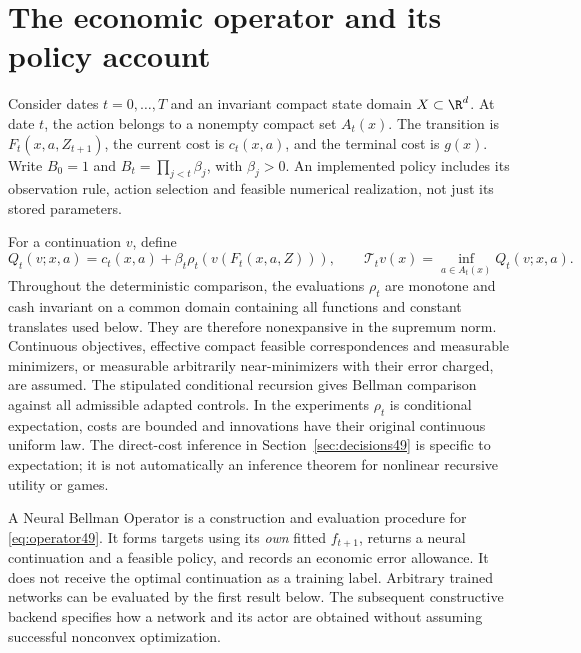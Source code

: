 \section{The economic operator and its policy account}\label{sec:core49}
Consider dates $t=0,\ldots,T$ and an invariant compact state domain $X\subset\R^d$. At date $t$, the action belongs to a nonempty compact set $A_t(x)$. The transition is $F_t(x,a,Z_{t+1})$, the current cost is $c_t(x,a)$, and the terminal cost is $g(x)$. Write $B_0=1$ and $B_t=\prod_{j<t}\beta_j$, with $\beta_j>0$. An implemented policy includes its observation rule, action selection and feasible numerical realization, not just its stored parameters.

For a continuation $v$, define
\begin{equation}\label{eq:operator49}
 Q_t(v;x,a)=c_t(x,a)+\beta_t\rho_t(v(F_t(x,a,Z))),\qquad
 \mathcal T_tv(x)=\inf_{a\in A_t(x)}Q_t(v;x,a).
\end{equation}
Throughout the deterministic comparison, the evaluations $\rho_t$ are monotone and cash invariant on a common domain containing all functions and constant translates used below. They are therefore nonexpansive in the supremum norm. Continuous objectives, effective compact feasible correspondences and measurable minimizers, or measurable arbitrarily near-minimizers with their error charged, are assumed. The stipulated conditional recursion gives Bellman comparison against all admissible adapted controls. In the experiments $\rho_t$ is conditional expectation, costs are bounded and innovations have their original continuous uniform law. The direct-cost inference in Section~\ref{sec:decisions49} is specific to expectation; it is not automatically an inference theorem for nonlinear recursive utility or games.

A Neural Bellman Operator is a construction and evaluation procedure for \eqref{eq:operator49}. It forms targets using its \emph{own} fitted $f_{t+1}$, returns a neural continuation and a feasible policy, and records an economic error allowance. It does not receive the optimal continuation as a training label. Arbitrary trained networks can be evaluated by the first result below. The subsequent constructive backend specifies how a network and its actor are obtained without assuming successful nonconvex optimization.

